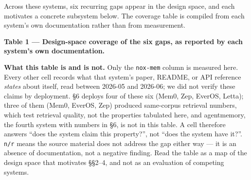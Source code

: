 \documentclass[
]{article}
\begin{document}
Across these systems, six recurring gaps appear in the design space, and
each motivates a concrete subsystem below. The coverage table is
compiled from each system's own documentation rather than from
measurement.

\textbf{Table 1 --- Design-space coverage of the six gaps, as reported
by each system's own documentation.}

\textbf{What this table is and is not.} Only the \texttt{nox-mem} column
is measured here. Every other cell records what that system's paper,
README, or API reference \emph{states} about itself, read between
2026-05 and 2026-06; we did not verify these claims by deployment. §6
deploys four of these six (Mem0, Zep, EverOS, Letta); three of them
(Mem0, EverOS, Zep) produced same-corpus retrieval numbers, which test
retrieval quality, not the properties tabulated here, and agentmemory,
the fourth system with numbers in §6, is not in this table. A cell
therefore answers ``does the system claim this property?'', not ``does
the system have it?''. \texttt{n/r} means the source material does not
address the gap either way --- it is an absence of documentation, not a
negative finding. Read the table as a map of the design space that
motivates §§2--4, and not as an evaluation of competing systems.
\end{document}
